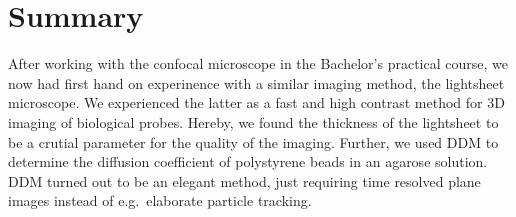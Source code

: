 
\chapter{Summary}\label{chap:fazit}
After working with the confocal microscope in the Bachelor's practical course, we now had first hand on experinence with a similar imaging method, the lightsheet microscope. We experienced the latter as a fast and high contrast method for 3D imaging of biological probes. Hereby, we found the thickness of the lightsheet to be a crutial parameter for the quality of the imaging. Further, we used DDM to determine the diffusion coefficient of polystyrene beads in an agarose solution. DDM turned out to be an elegant method, just requiring time resolved plane images instead of e.g.~elaborate particle tracking. 

